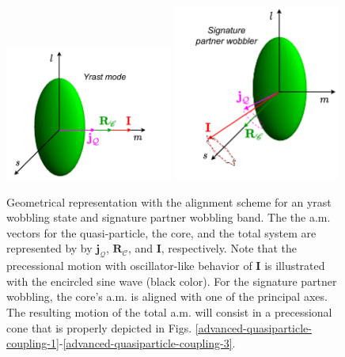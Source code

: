 \begin{figure}
    \centering
    \includegraphics[width=0.49\textwidth]{Chapters/Figures/yrast_wobbler-schematic.pdf}
    \includegraphics[width=0.49\textwidth]{Chapters/Figures/signaturePartner_wobbler-schematic.pdf}
    \caption{Geometrical representation with the alignment scheme for an yrast wobbling state and signature partner wobbling band. The the a.m. vectors for the quasi-particle, the core, and the total system are represented by by $\mathbf{j}_\mathcal{Q}$, $\mathbf{R}_\mathscr{C}$, and $\mathbf{I}$, respectively. Note that the precessional motion with oscillator-like behavior of $\mathbf{I}$ is illustrated with the encircled sine wave (black color). For the signature partner wobbling, the core's a.m. is aligned with one of the principal axes. The resulting motion of the total a.m. will consist in a precessional cone that is properly depicted in Figs. \ref{advanced-quasiparticle-coupling-1}-\ref{advanced-quasiparticle-coupling-3}.}
    \label{wobbling-geometry-YRAST-SPB}
\end{figure}


